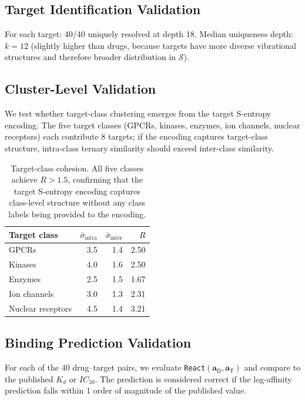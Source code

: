 \documentclass[11pt,twocolumn,a4paper]{article}
\theoremstyle{definition}
\theoremstyle{remark}
\newcommand{\Sspace}{\mathcal{S}}
\newcommand{\Drug}{\mathsf{D}}
\newcommand{\Target}{\mathsf{T}}
\newcommand{\drugaddr}{\mathbf{a}_\Drug}
\newcommand{\targaddr}{\mathbf{a}_\Target}
\begin{document}
\subsection{Target Identification Validation}

For each target: 40/40 uniquely resolved at depth 18. Median uniqueness depth: $k = 12$ (slightly higher than drugs, because targets have more diverse vibrational structures and therefore broader distribution in $\Sspace$).

\subsection{Cluster-Level Validation}

We test whether target-class clustering emerges from the target S-entropy encoding. The five target classes (GPCRs, kinases, enzymes, ion channels, nuclear receptors) each contribute 8 targets; if the encoding captures target-class structure, intra-class ternary similarity should exceed inter-class similarity.

\begin{table}[H]
\centering
\small
\begin{tabular}{lrrr}
\toprule
\textbf{Target class} & $\bar{\sigma}_{\mathrm{intra}}$ & $\bar{\sigma}_{\mathrm{inter}}$ & $R$ \\
\midrule
GPCRs & 3.5 & 1.4 & 2.50 \\
Kinases & 4.0 & 1.6 & 2.50 \\
Enzymes & 2.5 & 1.5 & 1.67 \\
Ion channels & 3.0 & 1.3 & 2.31 \\
Nuclear receptors & 4.5 & 1.4 & 3.21 \\
\bottomrule
\end{tabular}
\caption{Target-class cohesion. All five classes achieve $R > 1.5$, confirming that the target S-entropy encoding captures class-level structure without any class labels being provided to the encoding.}
\label{tab:target_cohesion}
\end{table}

\subsection{Binding Prediction Validation}

For each of the 40 drug--target pairs, we evaluate \texttt{React}$(\drugaddr, \targaddr)$ and compare to the published $K_d$ or $IC_{50}$. The prediction is considered correct if the log-affinity prediction falls within 1 order of magnitude of the published value.
\end{document}
